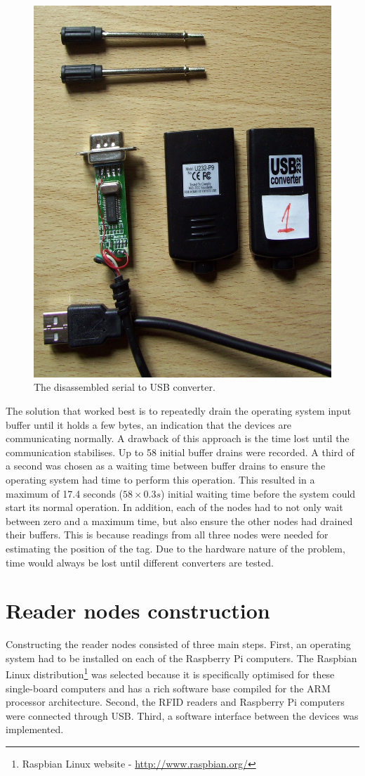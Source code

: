 \begin{figure}[h]
	\begin{center}
		\includegraphics[width=.6\textwidth]{figures/converter2}
		\caption{The disassembled serial to USB converter.}
		\label{fig:converter}
	\end{center}
\end{figure}

The solution that worked best is to repeatedly drain the operating system input buffer until it holds a few bytes, an indication that the devices are communicating normally. A drawback of this approach is the time lost until the communication stabilises. Up to 58 initial buffer drains were recorded. A third of a second was chosen as a waiting time between buffer drains to ensure the operating system had time to perform this operation. This resulted in a maximum of 17.4 seconds ($58 \times 0.3s$) initial waiting time before the system could start its normal operation. In addition, each of the nodes had to not only wait between zero and a maximum time, but also ensure the other nodes had drained their buffers. This is because readings from all three nodes were needed for estimating the position of the tag. Due to the hardware nature of the problem, time would always be lost until different converters are tested.


\section{Reader nodes construction}
\label{sec:constread}

Constructing the reader nodes consisted of three main steps. First, an operating system had to be installed on each of the Raspberry Pi computers. The Raspbian Linux distribution\footnote{Raspbian Linux website - \url{http://www.raspbian.org/}} was selected because it is specifically optimised for these single-board computers and has a rich software base compiled for the ARM processor architecture. Second, the RFID readers and Raspberry Pi computers were connected through USB. Third, a software interface between the devices was implemented.

